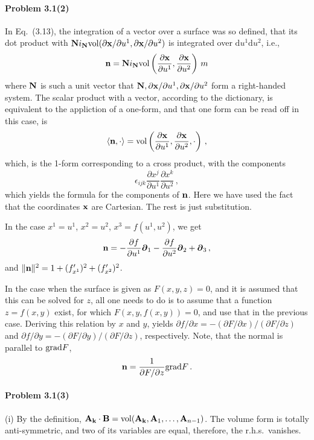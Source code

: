 \documentclass[a4paper,12pt]{article}
\def\d{\mathrm{d}}
\newcommand{\problem}[1]{\paragraph{Problem #1}}
\begin{document}

\problem{3.1(2)} In Eq.\ (3.13), the integration of a vector over a surface was so defined, that its dot product with ${\bf N}i_{\bf N}{\rm vol}(\partial{\bf x}/\partial u^1, \partial{\bf x}/\partial u^2)$ is integrated over $\d u^1 \d u^2$, i.e.,
\[
 {\bf n} = {\bf N}i_{\bf N}{\rm vol}\left(\frac{\partial\bf x}{\partial u^1}, \frac{\partial\bf x }{\partial u^2}\right)\,m
\]
where ${\bf N}$ is such a unit vector that ${\bf N}, \partial{\bf x}/\partial u^1, \partial{\bf x}/\partial u^2$ form a right-handed system. The scalar product with a vector, according to the dictionary, is equivalent to the appliction of a one-form, and that one form can be read off in this case, is
\[
 \langle{\bf n}, \cdot\rangle = {\rm vol}\left(\frac{\partial\bf x}{\partial u^1}, \frac{\partial\bf x }{\partial u^2},\cdot\right)\,,
\]
which, is the 1-form corresponding to a cross product, with the components
\[
 \epsilon_{ijk}\frac{\partial x^j}{\partial u^1}\frac{\partial x^k}{\partial u^2}\,,
\]
which yields the formula for the components of ${\bf n}$. Here we have used the fact that the coordinates ${\bf x}$ are Cartesian. The rest is just substitution.


In the case $x^1=u^1$, $x^2=u^2$, $x^3=f(u^1, u^2)$, we get
\[
 {\bf n} = -\frac{\partial f}{\partial u^1}\boldsymbol{\partial}_1-\frac{\partial f}{\partial u^2}\boldsymbol{\partial}_2 + \boldsymbol{\partial}_3\,,
\]
and $\|{\bf n}\|^2 = 1 + (f'_{x^1})^2+(f'_{x^2})^2$.

In the case when the surface is given as $F(x, y, z) =0$, and it is assumed that this can be solved for $z$, all one needs to do is to assume that a function $z=f(x,y)$ exist, for which $F(x, y, f(x, y))=0$, and use that in the previous case. Deriving this relation by $x$ and $y$, yields
$\partial f/\partial x = -(\partial F/\partial x)/(\partial F/\partial z)$ and $\partial f/\partial y = -(\partial F/\partial y)/(\partial F/\partial z)$, respectively. Note, that the normal is parallel to ${\rm grad}F$,
\[
 {\bf n}  = \frac{1}{\partial F/\partial z}{\rm grad}F\,.
\]


\problem{3.1(3)} (i) By the definition, ${\bf A_k}\cdot{\bf B} ={\rm vol}({\bf A_k}, {\bf A}_1, \dots, {\bf A}_{n-1})$. The volume form is totally anti-symmetric, and two of its variables are equal, therefore, the r.h.s.\ vanishes.
\end{document}

